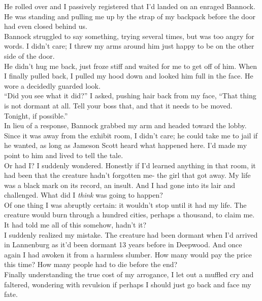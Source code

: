 \documentclass[a5paper]{scrartcl}
\begin{document}
He rolled over and I passively registered that I'd landed on an enraged Bannock. He was standing and pulling me up by the strap of my backpack before the door had even closed behind us.  \\


Bannock struggled to say something, trying several times, but was too angry for words. I didn't care; I threw my arms around him just happy to be on the other side of the door. \\


He didn't hug me back, just froze stiff and waited for me to get off of him. When I finally pulled back, I pulled my hood down and looked him full in the face. He wore a decidedly guarded look.   \\


\enquote{Did you see what it did?} I asked, pushing hair back from my face, \enquote{That thing is not dormant at all. Tell your boss that, and that it needs to be moved. Tonight, if possible.}\\


In lieu of a response, Bannock grabbed my arm and headed toward the lobby. Since it was away from the exhibit room, I didn't care; he could take me to jail if he wanted, as long as Jameson Scott heard what happened here. I'd made my point to him and lived to tell the tale. \\


Or had I? I suddenly wondered.  Honestly if I'd learned anything in that room, it had been that the creature hadn't forgotten me- the girl that got away. My life was a black mark on its record, an insult.  And I had gone into its lair and challenged. What did I \textit{think}
 was going to happen?\\


Of one thing I was abruptly certain: it wouldn't stop until it had my life. The creature would burn through a hundred cities, perhaps a thousand, to claim me. It had told me all of this somehow, hadn't it?\\


I suddenly realized my mistake. The creature had been dormant when I'd arrived in Lannenburg as it'd been dormant 13 years before in Deepwood. And once again I had awoken it from a harmless slumber. How many would pay the price this time?   How many people had to die before the end? \\


Finally understanding the true cost of my arrogance, I let out a muffled cry and faltered, wondering with revulsion if perhaps I should just go back and face my fate. \\
\end{document}

